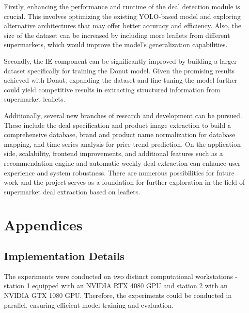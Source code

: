 \documentclass[11pt]{article}
\begin{document}
    Firstly, enhancing the performance and runtime of the deal detection module is crucial. This involves optimizing the existing YOLO-based model and exploring alternative architectures that may offer better accuracy and efficiency. Also, the size of the dataset can be increased by including more leaflets from different supermarkets, which would improve the model's generalization capabilities.

    Secondly, the IE component can be significantly improved by building a larger dataset specifically for training the Donut model. Given the promising results achieved with Donut, expanding the dataset and fine-tuning the model further could yield competitive results in extracting structured information from supermarket leaflets.

    Additionally, several new branches of research and development can be pursued. These include the deal specification and product image extraction to build a comprehensive database, brand and product name normalization for database mapping, and time series analysis for price trend prediction. On the application side, scalability, frontend improvements, and additional features such as a recommendation engine and automatic weekly deal extraction can enhance user experience and system robustness. There are numerous possibilities for future work and the project serves as a foundation for further exploration in the field of supermarket deal extraction based on leaflets.


\newpage

\appendix
\section*{Appendices}
\renewcommand{\thesubsection}{\Alph{subsection}}

\subsection{Implementation Details}
\label{app:implementation_details}

The experiments were conducted on two distinct computational workstations - station 1 equipped with an NVIDIA RTX 4080 GPU and station 2 with an NVIDIA GTX 1080 GPU. Therefore, the experiments could be conducted in parallel, ensuring efficient model training and evaluation.
\end{document}
